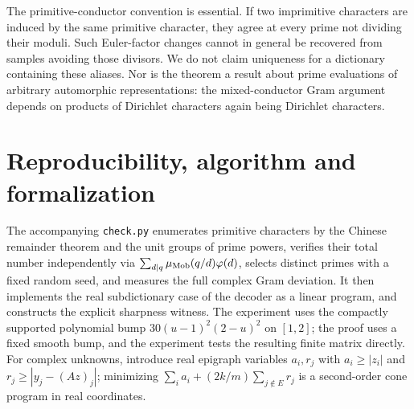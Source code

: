 \documentclass[11pt]{article}
\theoremstyle{remark}\newtheorem{remark}[theorem]{Remark}
\newcommand{\abs}[1]{\left|#1\right|}
\begin{document}
The primitive-conductor convention is essential. If two imprimitive characters are induced by the same primitive character, they agree at every prime not dividing their moduli. Such Euler-factor changes cannot in general be recovered from samples avoiding those divisors. We do not claim uniqueness for a dictionary containing these aliases. Nor is the theorem a result about prime evaluations of arbitrary automorphic representations: the mixed-conductor Gram argument depends on products of Dirichlet characters again being Dirichlet characters.

\section{Reproducibility, algorithm and formalization}\label{sec:implementation}
The accompanying \texttt{check.py} enumerates primitive characters by the Chinese remainder theorem and the unit groups of prime powers, verifies their total number independently via $\sum_{d\mid q}\mu_{\rm Mob}(q/d)\varphi(d)$, selects distinct primes with a fixed random seed, and measures the full complex Gram deviation. It then implements the real subdictionary case of the decoder as a linear program, and constructs the explicit sharpness witness. The experiment uses the compactly supported polynomial bump $30(u-1)^2(2-u)^2$ on $[1,2]$; the proof uses a fixed smooth bump, and the experiment tests the resulting finite matrix directly. For complex unknowns, introduce real epigraph variables $a_i,r_j$ with $a_i\ge\abs{z_i}$ and $r_j\ge\abs{y_j-(Az)_j}$; minimizing $\sum_i a_i+(2k/m)\sum_{j\notin E} r_j$ is a second-order cone program in real coordinates.
\end{document}
